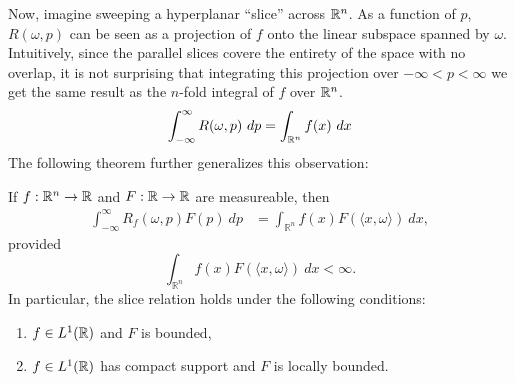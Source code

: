 
Now, imagine sweeping a hyperplanar ``slice'' across $\mathbb{R}^n$. As a function of $p$, $R(\omega, p)$ can be seen as a projection of $f$ onto the linear subspace spanned by $\omega$. Intuitively, since the parallel slices covere the entirety of the space with no overlap, it is not surprising that integrating this projection over $-\infty < p < \infty$ we get the same result as the $n$-fold integral of $f$ over $\mathbb{R}^n$.
\[
    \int_{-\infty}^\infty R(\omega, p) ~dp = \int_{\mathbb{R}^n} f(x) ~dx
\]
The following theorem further generalizes this observation:

\begin{proposition}
  If $f: \mathbb{R}^n \rightarrow \mathbb{R}$ and $F: \mathbb{R} \rightarrow \mathbb{R}$ are measureable, then
  \begin{align}
    \label{eq:ST}
    \int_{-\infty}^\infty R_f(\omega, p) F(p) ~dp 
    &= \int_{\mathbb{R}^n} f(x) F(\langle x, \omega \rangle) ~dx,
  \end{align}
  provided
  \[
    \int_{\mathbb{R}^n} f(x) F(\langle x, \omega \rangle) ~dx < \infty.
  \]
  In particular, the slice relation holds under the following conditions:
  \begin{enumerate}
    \item $f \in L^1(\mathbb{R})$ and $F$ is bounded,
    \item $f \in L^1(\mathbb{R})$ has compact support and $F$ is locally bounded.
  \end{enumerate}
\end{proposition}

